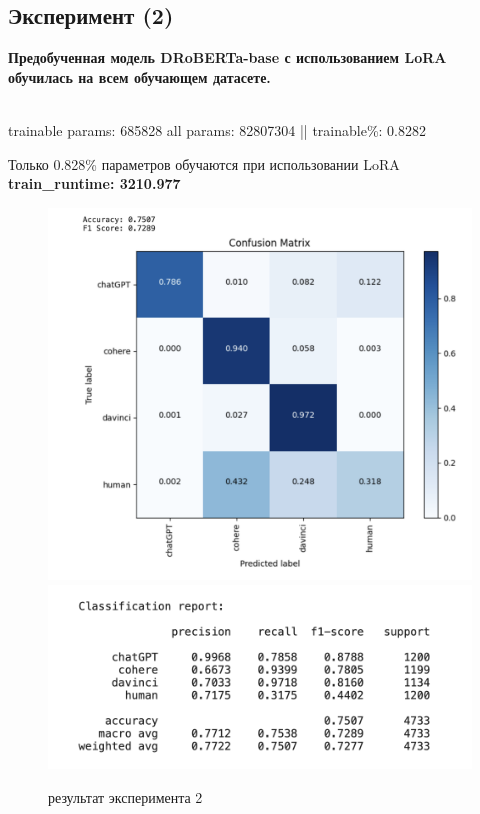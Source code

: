 \subsection{Эксперимент (2)}
\textbf{Предобученная модель DRoBERTa-base с использованием LoRA обучилась на всем обучающем датасете.}\\ \\
\begin{text}
 trainable params: 685828 all params: 82807304 || trainable\%: 0.8282    
\end{text}
Только 0.828\% параметров обучаются при использовании LoRA\\ 
\textbf{train\_runtime: 3210.977}\\
\begin{figure}[h]
    \centering
    \includegraphics[width=.75\textwidth]{images/bert_lora_4.png}
    \includegraphics[width=.65\textwidth]{images/exp2_report.png}
    \caption{результат эксперимента 2}
    \label{fig:2}
\end{figure}

\newpage
